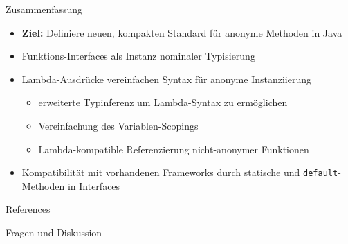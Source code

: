 \begin{frame}[fragile]{Zusammenfassung}
    \begin{itemize}
        \item<1-> \textbf{Ziel:} Definiere neuen, kompakten Standard für anonyme Methoden
        in Java
        \item<2-> Funktions-Interfaces als Instanz nominaler Typisierung
        \item<3-> Lambda-Ausdrücke vereinfachen Syntax für anonyme Instanziierung
        \begin{itemize}
            \item<4-> erweiterte Typinferenz um Lambda-Syntax zu ermöglichen
            \item<5-> Vereinfachung des Variablen-Scopings
            \item<6-> Lambda-kompatible Referenzierung nicht-anonymer Funktionen
        \end{itemize}
        \item<7-> Kompatibilität mit vorhandenen Frameworks durch statische und 
        \texttt{default}-Methoden in Interfaces
    \end{itemize}
\end{frame}

\begin{frame}{References}
    \nocite{*}
    
      
\end{frame}

\begin{frame}[plain,c]
    \centering
    \Huge Fragen und Diskussion 
\end{frame}